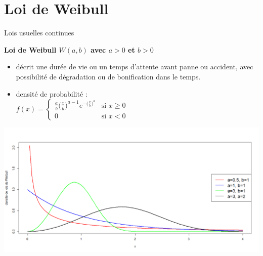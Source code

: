\documentclass{beamer}
\begin{document}

\section{Loi de Weibull}

\begin{frame}{Lois usuelles continues}

\begin{center}{\bf \Large Loi de Weibull $W(a,b)$ avec $a>0$ et $b>0$} \end{center}
\begin{itemize}
\item décrit une durée de vie ou un temps d'attente avant panne ou accident, avec possibilité de dégradation ou de bonification dans le temps. 
\end{itemize}

\begin{minipage}{0.6\textwidth}
\begin{itemize}
\item \small densité de probabilité  : \\
$
f(x)=
\begin{cases}
\frac{a}{b} \big( \frac{x}{b} \big)^{a-1} e^{ - \big( \frac{x}{b} \big)^{a} } &{\mbox {si }} x\geq 0\\
0 & \mbox {si } x<0
\end{cases}
$
\end{itemize}
\end{minipage}
\begin{minipage}{0.3\textwidth}
\includegraphics[scale=0.13]{images/densite_weibull.png}  
\end{minipage}


\end{frame}
\end{document}
